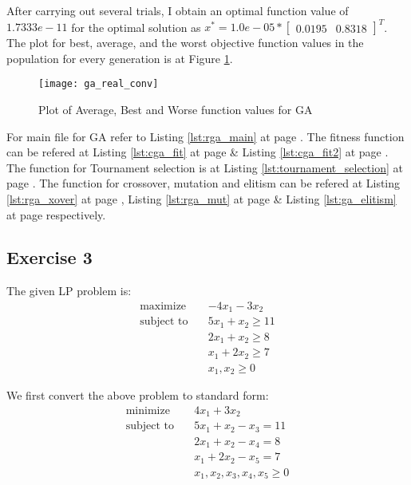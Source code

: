 \documentclass[a4paper,11pt]{article}
\newcommand{\mat}[1]{\begin{bmatrix}#1\end{bmatrix}}
\newcommand{\reflst}[1]{Listing \ref{#1} at page \pageref{#1}}
\newcommand{\reffig}[1]{Figure \ref{#1}}
\begin{document}
\noindent After carrying out several trials, I obtain an optimal function value of $1.7333e-11$ for the optimal solution as
$x^* = 1.0e-05*\mat{0.0195&    0.8318}^T$. The plot for best, average, and the worst objective function values in the population for every generation is at \reffig{fig:ga_real_conv}.

\begin{figure}[!h]
 \centering
 \texttt{[image: ga\_real\_conv]}
 \caption{Plot of Average, Best and Worse function values for GA}
 \label{fig:ga_real_conv}
\end{figure}

\noindent For main file for GA refer to \reflst{lst:rga_main}. The fitness function can be refered at \reflst{lst:cga_fit} \&  \reflst{lst:cga_fit2}. The function for Tournament selection is at \reflst{lst:tournament_selection}. The function for crossover, mutation and elitism can be refered at \reflst{lst:rga_xover}, \reflst{lst:rga_mut} \& \reflst{lst:ga_elitism} respectively.

%
\clearpage
\vspace{2ex}
%
\subsection*{Exercise 3}
The given LP problem is:
\begin{align*}
 \text{maximize} \quad& -4x_1 -3x_2\\
 \text{subject to} \quad& 5x_1 +x_2 \geq 11\\
 & 2x_1 +x_2 \geq 8\\
 & x_1 + 2x_2 \geq 7\\
 & x_1,x_2 \geq 0
\end{align*}

\noindent We first convert the above problem to standard form:
\begin{align*}
 \text{minimize} \quad& 4x_1 +3x_2\\
 \text{subject to} \quad& 5x_1 +x_2 - x_3=  11\\
 & 2x_1 +x_2 -x_4 = 8\\
 & x_1 + 2x_2 -x_5 = 7\\
 & x_1,x_2,x_3,x_4,x_5 \geq 0
\end{align*}
\end{document}
